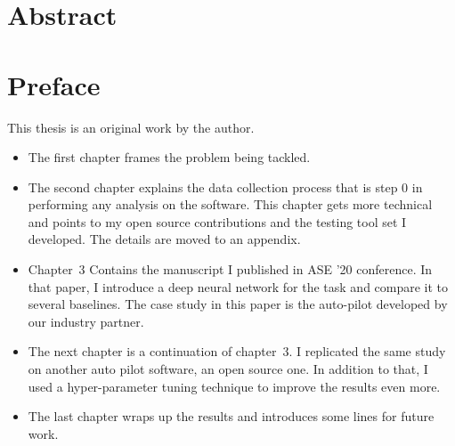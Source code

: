 
\chapter{Abstract}



\chapter{Preface}

This thesis is an original work by the author. 
\begin{itemize}
    \item The first chapter frames the problem being tackled. 
    \item The second chapter explains the data collection process that is step 0 in performing any analysis on the software. This chapter gets more technical and points to my open source contributions and the testing tool set I developed.%
    The details are moved to an appendix.
    \item Chapter~3 Contains the manuscript I published in ASE '20 conference. In that paper, I introduce a deep neural network for the task and compare it to several baselines. The case study in this paper is the auto-pilot developed by our industry partner.
    \item The next chapter is a continuation of chapter~3. I replicated the same study on another auto pilot software, an open source one. In addition to that, I used a hyper-parameter tuning technique to improve the results even more.
    \item The last chapter wraps up the results and introduces some lines for future work.
\end{itemize}


\dedication{To the ones who made this a smoother journey.} 


\tableofcontents


\listoftables


\listoffigures

